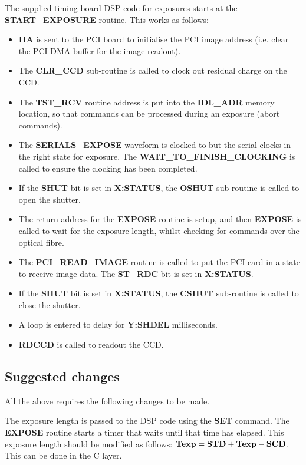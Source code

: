 \documentclass[10pt,a4paper]{article}
\begin{document}
The supplied timing board DSP code for exposures starts at the {\bf START\_EXPOSURE} routine. This works as follows:

\begin{itemize}
\item {\bf IIA} is sent to the PCI board to initialise the PCI image address 
      (i.e. clear the PCI DMA buffer for the image readout).
\item The {\bf CLR\_CCD} sub-routine is called to clock out residual charge on the CCD.
\item The {\bf TST\_RCV} routine address is put into the {\bf IDL\_ADR} memory location, so that commands can be
      processed during an exposure (abort commands).
\item The {\bf SERIALS\_EXPOSE} waveform is clocked to but the serial clocks in the right state for exposure. 
      The {\bf WAIT\_TO\_FINISH\_CLOCKING} is called to ensure the clocking has been completed.
\item If the {\bf SHUT} bit is set in {\bf X:STATUS}, the {\bf OSHUT} sub-routine is called to open the shutter.
\item The return address for the {\bf EXPOSE} routine is setup, and then {\bf EXPOSE} is called to wait for the
      exposure length, whilst checking for commands over the optical fibre.
\item The {\bf PCI\_READ\_IMAGE} routine is called to put the PCI card in a state to receive image data. The {\bf ST\_RDC} bit is set in {\bf X:STATUS}.
\item If the {\bf SHUT} bit is set in {\bf X:STATUS}, the {\bf CSHUT} sub-routine is called to close the shutter.
\item A loop is entered to delay for {\bf Y:SHDEL} milliseconds.
\item {\bf RDCCD} is called to readout the CCD.
\end{itemize}


\subsection{Suggested changes}

All the above requires the following changes to be made.

The exposure length is passed to the DSP code using the {\bf SET} command. The {\bf EXPOSE} routine starts a timer
that waits until that time has elapsed. This exposure length should be modified as follows:
${\bf Texp} = {\bf STD} + {\bf Texp} - {\bf SCD}$. This can be done in the C layer.
\end{document}
